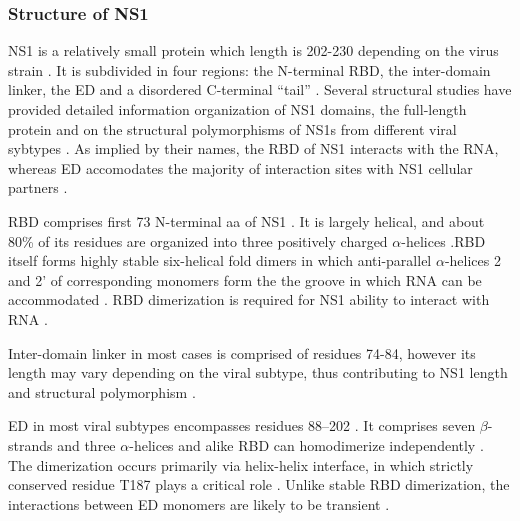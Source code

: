 		
		\subsubsection{Structure of NS1}
		
		\gls{NS1} is a relatively small protein which length is 202-230 depending on the virus strain \parencite{Hale2008b}. It is subdivided in four regions: the N-terminal \gls{RBD}, the inter-domain linker, the \gls{ED} and a disordered C-terminal ``tail'' \parencite{Hale2014}. Several structural studies have provided detailed information organization of \gls{NS1} domains, the full-length protein and on the structural polymorphisms of \gls{NS1}s from different viral sybtypes \parencite{Chien1997, Liu1997a, Wang1999a, Bornholdt2006, Yin2007a, Hale2008c, Cheng2009, Xia2009, Kerry2011, Carrillo2014}. As implied by their names, the \gls{RBD} of NS1 interacts with the RNA, whereas \gls{ED} accomodates the majority of interaction sites with \gls{NS1} cellular partners \parencite{Hale2008b}.
		
		\gls{RBD} comprises first 73 N-terminal aa of \gls{NS1} \parencite{Qian1995a, Yin2007a}. It is largely helical, and about 80\% of its residues are organized into three positively charged $\alpha$-helices \parencite{Qian1995a, Liu1997a}.\gls{RBD} itself forms highly stable six-helical fold dimers in which anti-parallel $\alpha$-helices 2 and 2' of corresponding monomers form the the groove in which RNA can be accommodated \parencite{Chien1997, Wang1999a}. \gls{RBD} dimerization is required for \gls{NS1} ability to interact with RNA \parencite{Wang1999a}.
		
		Inter-domain linker in most cases is comprised of residues 74-84, however its length may vary depending on the viral subtype, thus contributing to \gls{NS1} length and structural polymorphism \parencite{Bornholdt2006, Carrillo2014, Kerry2011}.
		
		\gls{ED} in most viral subtypes encompasses residues 88--202 \parencite{Hale2014}. It comprises seven $\beta$-strands and three $\alpha$-helices and alike \gls{RBD} can homodimerize independently \parencite{Bornholdt2006, Hale2008c, Xia2009}. The dimerization occurs primarily via helix-helix interface, in which strictly conserved residue T187 plays a critical role \parencite{Hale2008c, Kerry2011}. Unlike stable \gls{RBD} dimerization, the interactions between \gls{ED} monomers are likely to be transient \parencite{Kerry2011, Hale2014}.
		
